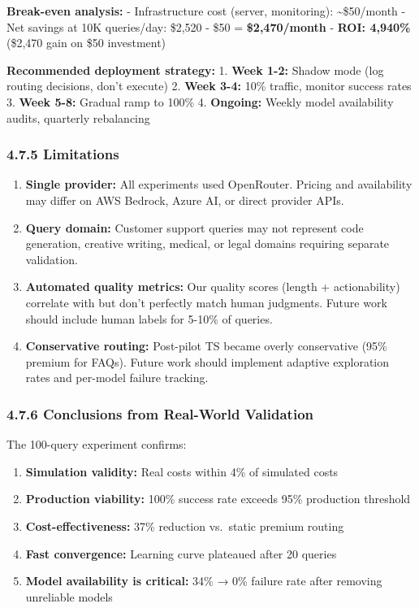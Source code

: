 \documentclass[
]{article}
\providecommand{\tightlist}{%
  \setlength{\itemsep}{0pt}\setlength{\parskip}{0pt}}
\begin{document}
\textbf{Break-even analysis:} - Infrastructure cost (server,
monitoring): \textasciitilde\$50/month - Net savings at 10K queries/day:
\$2,520 - \$50 = \textbf{\$2,470/month} - \textbf{ROI: 4,940\%} (\$2,470
gain on \$50 investment)

\textbf{Recommended deployment strategy:} 1. \textbf{Week 1-2:} Shadow
mode (log routing decisions, don't execute) 2. \textbf{Week 3-4:} 10\%
traffic, monitor success rates 3. \textbf{Week 5-8:} Gradual ramp to
100\% 4. \textbf{Ongoing:} Weekly model availability audits, quarterly
rebalancing

\hypertarget{limitations}{%
\subsubsection{4.7.5 Limitations}\label{limitations}}

\begin{enumerate}
\def\labelenumi{\arabic{enumi}.}
\item
  \textbf{Single provider:} All experiments used OpenRouter. Pricing and
  availability may differ on AWS Bedrock, Azure AI, or direct provider
  APIs.
\item
  \textbf{Query domain:} Customer support queries may not represent code
  generation, creative writing, medical, or legal domains requiring
  separate validation.
\item
  \textbf{Automated quality metrics:} Our quality scores (length +
  actionability) correlate with but don't perfectly match human
  judgments. Future work should include human labels for 5-10\% of
  queries.
\item
  \textbf{Conservative routing:} Post-pilot TS became overly
  conservative (95\% premium for FAQs). Future work should implement
  adaptive exploration rates and per-model failure tracking.
\end{enumerate}

\hypertarget{conclusions-from-real-world-validation}{%
\subsubsection{4.7.6 Conclusions from Real-World
Validation}\label{conclusions-from-real-world-validation}}

The 100-query experiment confirms:

\begin{enumerate}
\def\labelenumi{\arabic{enumi}.}
\tightlist
\item
  \textbf{Simulation validity:} Real costs within 4\% of simulated costs
\item
  \textbf{Production viability:} 100\% success rate exceeds 95\%
  production threshold
\item
  \textbf{Cost-effectiveness:} 37\% reduction vs.~static premium routing
\item
  \textbf{Fast convergence:} Learning curve plateaued after 20 queries
\item
  \textbf{Model availability is critical:} 34\% → 0\% failure rate after
  removing unreliable models
\end{enumerate}
\end{document}
